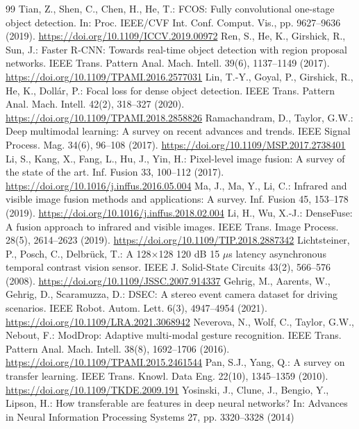 \begin{thebibliography}{99}
 Tian, Z., Shen, C., Chen, H., He, T.: FCOS: Fully convolutional one-stage object detection. In: Proc. IEEE/CVF Int. Conf. Comput. Vis., pp. 9627--9636 (2019). \url{https://doi.org/10.1109/ICCV.2019.00972}
 Ren, S., He, K., Girshick, R., Sun, J.: Faster R-CNN: Towards real-time object detection with region proposal networks. IEEE Trans. Pattern Anal. Mach. Intell. 39(6), 1137--1149 (2017). \url{https://doi.org/10.1109/TPAMI.2016.2577031}
 Lin, T.-Y., Goyal, P., Girshick, R., He, K., Doll\'{a}r, P.: Focal loss for dense object detection. IEEE Trans. Pattern Anal. Mach. Intell. 42(2), 318--327 (2020). \url{https://doi.org/10.1109/TPAMI.2018.2858826}
 Ramachandram, D., Taylor, G.W.: Deep multimodal learning: A survey on recent advances and trends. IEEE Signal Process. Mag. 34(6), 96--108 (2017). \url{https://doi.org/10.1109/MSP.2017.2738401}
 Li, S., Kang, X., Fang, L., Hu, J., Yin, H.: Pixel-level image fusion: A survey of the state of the art. Inf. Fusion 33, 100--112 (2017). \url{https://doi.org/10.1016/j.inffus.2016.05.004}
 Ma, J., Ma, Y., Li, C.: Infrared and visible image fusion methods and applications: A survey. Inf. Fusion 45, 153--178 (2019). \url{https://doi.org/10.1016/j.inffus.2018.02.004}
 Li, H., Wu, X.-J.: DenseFuse: A fusion approach to infrared and visible images. IEEE Trans. Image Process. 28(5), 2614--2623 (2019). \url{https://doi.org/10.1109/TIP.2018.2887342}
 Lichtsteiner, P., Posch, C., Delbr\"uck, T.: A 128$\times$128 120 dB 15 $\mu$s latency asynchronous temporal contrast vision sensor. IEEE J. Solid-State Circuits 43(2), 566--576 (2008). \url{https://doi.org/10.1109/JSSC.2007.914337}
 Gehrig, M., Aarents, W., Gehrig, D., Scaramuzza, D.: DSEC: A stereo event camera dataset for driving scenarios. IEEE Robot. Autom. Lett. 6(3), 4947--4954 (2021). \url{https://doi.org/10.1109/LRA.2021.3068942}
 Neverova, N., Wolf, C., Taylor, G.W., Nebout, F.: ModDrop: Adaptive multi-modal gesture recognition. IEEE Trans. Pattern Anal. Mach. Intell. 38(8), 1692--1706 (2016). \url{https://doi.org/10.1109/TPAMI.2015.2461544}
 Pan, S.J., Yang, Q.: A survey on transfer learning. IEEE Trans. Knowl. Data Eng. 22(10), 1345--1359 (2010). \url{https://doi.org/10.1109/TKDE.2009.191}
 Yosinski, J., Clune, J., Bengio, Y., Lipson, H.: How transferable are features in deep neural networks? In: Advances in Neural Information Processing Systems 27, pp. 3320--3328 (2014)
\end{thebibliography}

